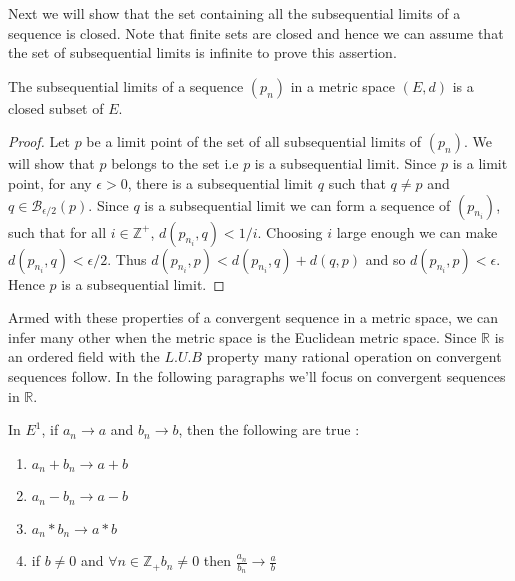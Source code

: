 Next we will show that the set containing all the subsequential limits of a sequence is closed. Note
that finite sets are closed and hence we can assume that the set of subsequential limits is infinite
to prove this assertion.

\begin{Theorem}
    The subsequential limits of a sequence $(p_n)$ in a metric space $(E,d)$ is a closed subset of
    $E$.
\end{Theorem}
\begin{proof}
    Let $p$ be a limit point of the set of all subsequential limits of $(p_n)$. We will show that
    $p$ belongs to the set i.e $p$ is a subsequential limit. Since $p$ is a limit point, for any $
    \epsilon > 0$, there is a subsequential limit $q$ such that $q \neq p$ and $q \in
    \mathcal{B}_{\epsilon / 2}(p)$. Since $q$ is a subsequential limit we can form a sequence of
    $(p_{n_i})$, such that for all $i \in \mathbb{Z}^{+}$, $d(p_{n_i},q) < 1/i$. Choosing $i$ large
    enough we can make $d(p_{n_i},q) < \epsilon/2$. Thus $d(p_{n_i},p) < d(p_{n_i},q) + d(q,p)$ and
    so $d(p_{n_i},p) < \epsilon$. Hence $p$ is a subsequential limit.  
\end{proof}


Armed with these properties of a convergent sequence in a metric space, we can infer many other 
when the metric space is the Euclidean metric space. Since $\mathbb{R}$ is an ordered field with
the $L.U.B$ property many rational operation on convergent sequences follow. In the following 
paragraphs we'll focus on convergent sequences in $\mathbb{R}$.
\begin{Theorem}[name=Convergent sequences in $\mathbb{R}$]
    In $E^1$, if $a_n \rightarrow a$ and $b_n \rightarrow b$, then the following are true :
    \begin{enumerate}
	\item $a_n + b_n \rightarrow a+b$ 
	\item $a_n - b_n \rightarrow a-b $
	\item $a_n * b_n \rightarrow a*b $
	\item if $b \neq 0 $ and $\forall n \in \mathbb{Z}_+ b_n \neq 0$ then $\frac{a_n}{b_n} \rightarrow
	    \frac{a}{b}$
    \end{enumerate}
\end{Theorem}

